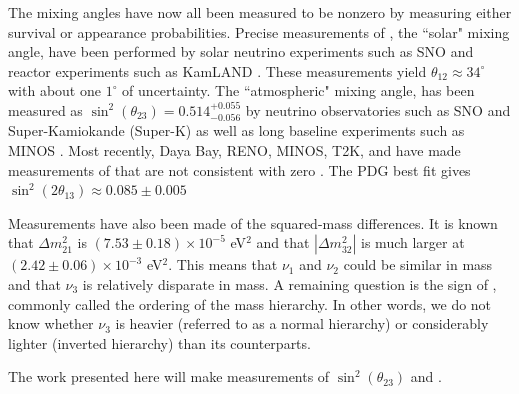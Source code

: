 The mixing angles have now all been measured to be nonzero by measuring either
survival or appearance probabilities.
Precise measurements of \thetaot, the ``solar" mixing angle, have been
performed by solar neutrino experiments such as SNO and reactor experiments
such as KamLAND \cite{sno, kamland, pdg}.
 These measurements yield $\theta_{12} \approx 34^\circ$ with about one
 $1^\circ$ of uncertainty.
The ``atmospheric" mixing angle, \thetatth has been measured as
$\sin^2(\theta_{23}) =  0.514^{+0.055}_{-0.056}$ by neutrino observatories
such as SNO and Super-Kamiokande (Super-K) as well as long baseline
experiments such as MINOS \cite{sno, superK, minos, pdg}.
Most recently, Daya Bay, RENO, MINOS, T2K, and \nova have made measurements of
\thetaoth that are not consistent with zero
\cite{dayaBay, reno, minos13,abe2014observation,nova2015nue}.
The PDG best fit gives $\sin^2(2 \theta_{13}) \approx 0.085 \pm 0.005$

Measurements have also been made of the squared-mass differences.
It is known that $\Delta m_{21}^2$ is $(7.53 \pm 0.18) \times 10^{-5}$ eV${}^2$
and that $|\Delta m_{32}^2|$ is much larger at $(2.42 \pm 0.06) \times10^{-3}$
eV${^2}$.
This means that $\nu_1$ and $\nu_2$ could be similar in mass and that $\nu_3$
is relatively disparate in mass.
A remaining question is the sign of \deltamtht, commonly called the ordering of
the mass hierarchy.
In other words, we do not know whether $\nu_3$ is heavier (referred to as a
normal hierarchy) or considerably lighter (inverted hierarchy) than its
counterparts.

The work presented here will make measurements of $\sin^2(\theta_{23})$ and
\deltamtht.


